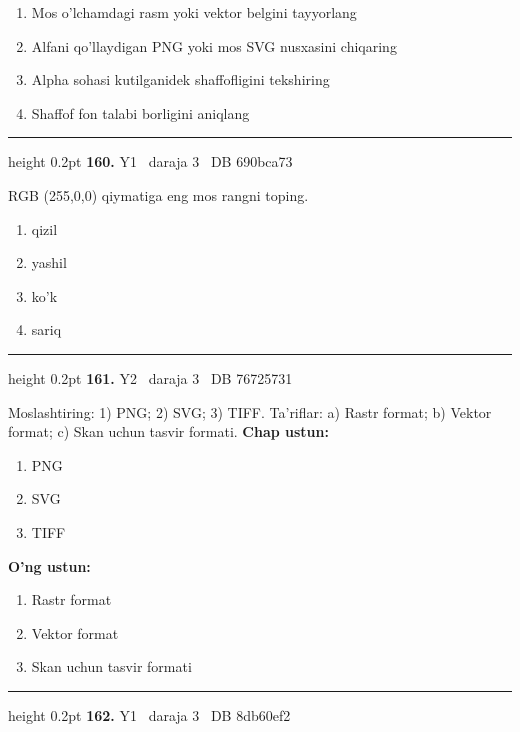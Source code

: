 \documentclass[10pt,a4paper,oneside]{article}
\begin{document}
\begin{enumerate}[label=\Alph*),leftmargin=9mm]
\item Mos o'lchamdagi rasm yoki vektor belgini tayyorlang
\item Alfani qo'llaydigan PNG yoki mos SVG nusxasini chiqaring
\item Alpha sohasi kutilganidek shaffofligini tekshiring
\item Shaffof fon talabi borligini aniqlang
\end{enumerate}
\vspace{2mm}\hrule height 0.2pt \vspace{4mm}
\hypertarget{q160}{\textbf{\color{ink}160.}}  {\color{muted}\scriptsize Y1 \textbullet\ daraja 3 \textbullet\ DB 690bca73}
\par
RGB (255,0,0) qiymatiga eng mos rangni toping.
\begin{enumerate}[label=\Alph*),leftmargin=9mm]
\item qizil
\item yashil
\item ko'k
\item sariq
\end{enumerate}
\vspace{2mm}\hrule height 0.2pt \vspace{4mm}
\hypertarget{q161}{\textbf{\color{ink}161.}}  {\color{muted}\scriptsize Y2 \textbullet\ daraja 3 \textbullet\ DB 76725731}
\par
Moslashtiring: 1) PNG; 2) SVG; 3) TIFF. Ta'riflar: a) Rastr format; b) Vektor format; c) Skan uchun tasvir formati.
\textbf{\footnotesize Chap ustun:}
\begin{enumerate}[label=\arabic*),leftmargin=9mm]
\item PNG
\item SVG
\item TIFF
\end{enumerate}
\textbf{\footnotesize O'ng ustun:}
\begin{enumerate}[label=\Alph*),leftmargin=9mm]
\item Rastr format
\item Vektor format
\item Skan uchun tasvir formati
\end{enumerate}
\vspace{2mm}\hrule height 0.2pt \vspace{4mm}
\hypertarget{q162}{\textbf{\color{ink}162.}}  {\color{muted}\scriptsize Y1 \textbullet\ daraja 3 \textbullet\ DB 8db60ef2}
\end{document}
